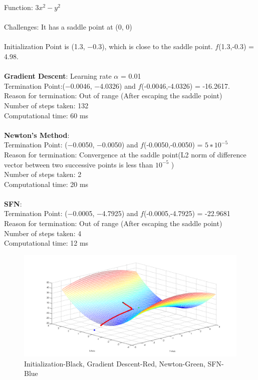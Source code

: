 \newpage

Function: $3x^2-y^2$
\\\\
Challenges: It has a saddle point at (0, 0)
\\\\
Initialization Point is (1.3, −0.3), which is close to the saddle point. $f$(1.3,-0.3) = 4.98.
\\\\
\textbf{Gradient Descent}: Learning rate $\alpha$ = 0.01
\\Termination Point:(−0.0046, −4.0326) and $f$(-0.0046,-4.0326) = -16.2617.
\\Reason for termination: Out of range (After escaping the saddle point)
\\Number of steps taken: 132
\\Computational time: 60 ms
\\\\
\textbf{Newton’s Method}: 
\\Termination Point: (−0.0050, −0.0050) and $f$(-0.0050,-0.0050) = $5 ∗ 10^{-5}$
\\Reason for termination: Convergence at the saddle point(L2 norm of difference vector between two successive points is less than $10^{-5}$ )
\\Number of steps taken: 2
\\Computational time: 20 ms
\\\\
\textbf{SFN}: 
\\Termination Point: (−0.0005, −4.7925) and $f$(-0.0005,-4.7925) = -22.9681
\\Reason for termination: Out of range (After escaping the saddle point)
\\Number of steps taken: 4
\\Computational time: 12 ms

\begin{figure}[H]
\includegraphics[scale = 0.45]{1.png}
\caption{Initialization-Black, Gradient Descent-Red, Newton-Green, SFN-Blue}
\end{figure}

